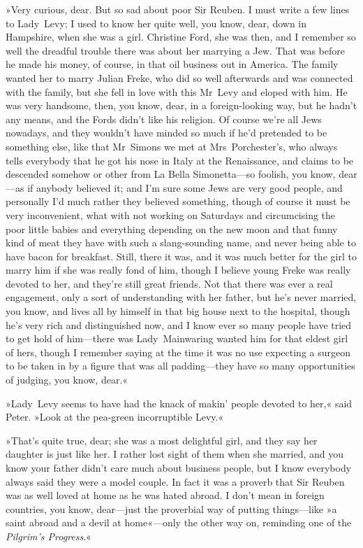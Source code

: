 »Very curious, dear. But so sad about poor Sir Reuben. I must write a few lines to Lady~Levy; I used to know her quite well, you know, dear, down in Hampshire, when she was a girl. Christine Ford, she was then, and I remember so well the dreadful trouble there was about her marrying a Jew. That was before he made his money, of course, in that oil business out in America. The family wanted her to marry Julian Freke, who did so well afterwards and was connected with the family, but she fell in love with this Mr~Levy and eloped with him. He was very handsome, then, you know, dear, in a foreign-looking way, but he hadn't any means, and the Fords didn't like his religion. Of course we're all Jews nowadays, and they wouldn't have minded so much if he'd pretended to be something else, like that Mr~Simons we met at Mrs~Porchester's, who always tells everybody that he got his nose in Italy at the Renaissance, and claims to be descended somehow or other from La Bella Simonetta—so foolish, you know, dear—as if anybody believed it; and I'm sure some Jews are very good people, and personally I'd much rather they believed something, though of course it must be very inconvenient, what with not working on Saturdays and circumcising the poor little babies and everything depending on the new moon and that funny kind of meat they have with such a slang-sounding name, and never being able to have bacon for breakfast. Still, there it was, and it was much better for the girl to marry him if she was really fond of him, though I believe young Freke was really devoted to her, and they're still great friends. Not that there was ever a real engagement, only a sort of understanding with her father, but he's never married, you know, and lives all by himself in that big house next to the hospital, though he's very rich and distinguished now, and I know ever so many people have tried to get hold of him—there was Lady~Mainwaring wanted him for that eldest girl of hers, though I remember saying at the time it was no use expecting a surgeon to be taken in by a figure that was all padding—they have so many opportunities of judging, you know, dear.«

»Lady~Levy seems to have had the knack of makin' people devoted to her,« said Peter. »Look at the pea-green incorruptible Levy.«

»That's quite true, dear; she was a most delightful girl, and they say her daughter is just like her. I rather lost sight of them when she married, and you know your father didn't care much about business people, but I know everybody always said they were a model couple. In fact it was a proverb that Sir Reuben was as well loved at home as he was hated abroad. I don't mean in foreign countries, you know, dear—just the proverbial way of putting things—like »a saint abroad and a devil at home«---only the other way on, reminding one of the \textit{Pilgrim's Progress}.«


